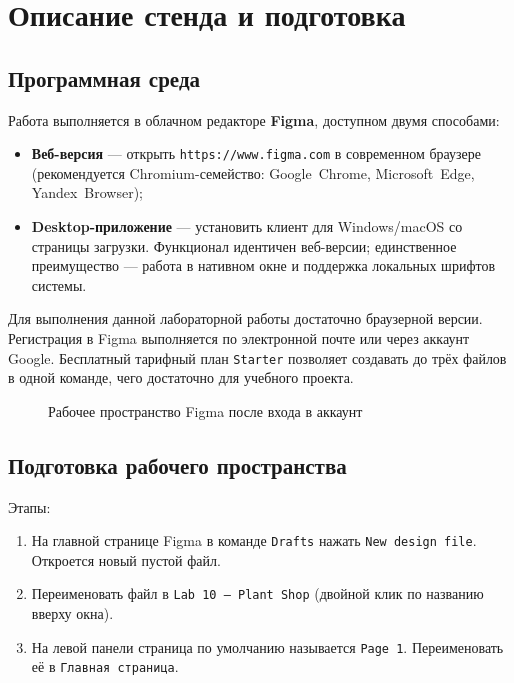 \chapter{Описание стенда и подготовка}
\label{ch:stand}

\section{Программная среда}

Работа выполняется в облачном редакторе \textbf{Figma}, доступном двумя
способами:
\begin{itemize}
  \item \textbf{Веб-версия} --- открыть \texttt{https://www.figma.com}
        в современном браузере (рекомендуется Chromium-семейство:
        Google~Chrome, Microsoft~Edge, Yandex~Browser);
  \item \textbf{Desktop-приложение} --- установить клиент для
        Windows/macOS со страницы загрузки. Функционал идентичен
        веб-версии; единственное преимущество --- работа в нативном окне
        и поддержка локальных шрифтов системы.
\end{itemize}
Для выполнения данной лабораторной работы достаточно браузерной версии.
Регистрация в Figma выполняется по электронной почте или через аккаунт
Google. Бесплатный тарифный план \texttt{Starter} позволяет создавать
до трёх файлов в одной команде, чего достаточно для учебного проекта.

\begin{figure}[h]
  \centering
  \caption{Рабочее пространство Figma после входа в аккаунт}
  \label{fig:workspace}
\end{figure}

\section{Подготовка рабочего пространства}

Этапы:
\begin{enumerate}
  \item На главной странице Figma в команде \texttt{Drafts} нажать
        \texttt{New design file}. Откроется новый пустой файл.
  \item Переименовать файл в \texttt{Lab~10~--~Plant~Shop}
        (двойной клик по названию вверху окна).
  \item На левой панели страница по умолчанию называется
        \texttt{Page~1}. Переименовать её в \texttt{Главная страница}.
\end{enumerate}

